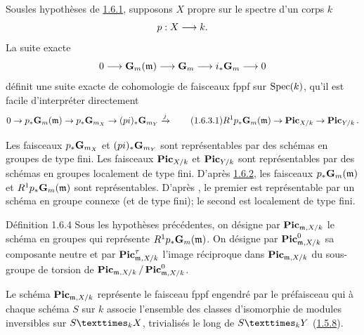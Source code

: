\documentclass[10pt]{../fichiers-configuration-latex/smfart}
\begin{document}
\subsubsection{}
Sous\pageoriginale les hypothèses de \hyperref[XVIII.lem1.6.1]{1.6.1}, supposons
$X$ propre sur le spectre d'un corps $k$
$$
p:X\longrightarrow k{}.
$$
La suite exacte
$$
0\longrightarrow \mathbf{G}_{m}(\mathfrak{m})\longrightarrow
\mathbf{G}_{m}\longrightarrow i_{\ast}\mathbf{G}_{m}\longrightarrow 0
$$
définit une suite exacte de cohomologie de faisceaux fppf sur $\operatorname{Spec}
(k)$, qu'il est facile d'interpréter directement
\begin{equation*}
 0\rightarrow p_{\ast}\mathbf{G}_{m}(\mathfrak{m})\rightarrow
p_{\ast}\mathbf{G}_{m_{X}}\rightarrow
(pi)_{\ast}\mathbf{G}_{m_{Y}}\xrightarrow{j}\tag{1.6.3.1}
 R^{1}p_{\ast}\mathbf{G}_{m}(\mathfrak{m})\rightarrow
\operatorname{\mathbf{Pic}}_{X/k}\rightarrow \operatorname{\mathbf{Pic}}_{Y/k}{}.
\end{equation*}

Les faisceaux $p_{\ast}\mathbf{G}_{m_{X}}$ et
$(pi)_{\ast}\mathbf{G}_{m_{Y}}$ sont représentables par des schémas en
groupes de type fini. Les faisceaux $\operatorname{\mathbf{Pic}}_{X/k}$ et
$\operatorname{\mathbf{Pic}}_{Y/k}$ sont représentables par des schémas en groupes
localement de type fini. D'après \hyperref[XVIII.subsubsec1.6.2]{1.6.2}, les faisceaux
$p_{\ast}\mathbf{G}_{m}(\mathfrak{m})$ et
$R^{1}p_{\ast}\mathbf{G}_{m}(\mathfrak{m})$ sont représentables. D'après
, le premier est représentable par un schéma en groupe
connexe (et de type fini); le second est localement de type fini.

\begin{enonce*}{Définition 1.6.4}
Sous les hypothèses précédentes, on désigne par
$\operatorname{\mathbf{Pic}}_{\mathfrak{m},X/k}$ le schéma en groupes qui représente
$R^{1}p_{\ast}\mathbf{G}_{m}(\mathfrak{m})$. On désigne par
$\operatorname{\mathbf{Pic}}^{0}_{\mathfrak{m},X/k}$ sa composante neutre et par
$\operatorname{\mathbf{Pic}}^{\tau}_{\mathfrak{m},X/k}$ l'image réciproque dans
$\operatorname{\mathbf{Pic}}_{\mathfrak{m},X/k}$ du sous-groupe de torsion de
$\operatorname{\mathbf{Pic}}_{\mathfrak{m},X/k}/\operatorname{\mathbf{Pic}}^{0}_{\mathfrak{m},X/k}$.
\end{enonce*}

Le schéma $\operatorname{\mathbf{Pic}}_{\mathfrak{m},X/k}$ représente le faisceau fppf engendré par
le préfaisceau qui à chaque schéma $S$ sur $k$ associe l'ensemble
des classes d'isomorphie de modules inversibles sur $\fprod{S}{X}{k}$,
trivialisés le long de $\fprod{S}{Y}{k}$ (\hyperref[XVIII.subsubsec1.5.8]{1.5.8}).
\end{document}
